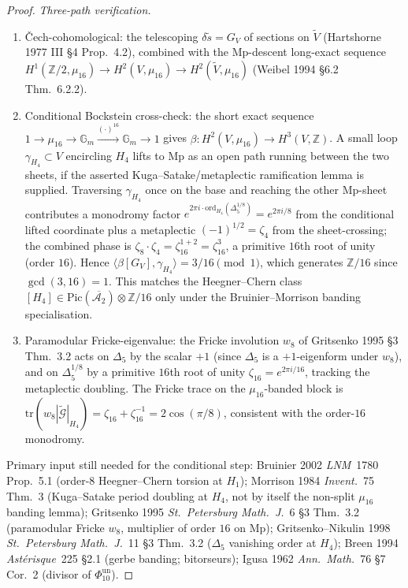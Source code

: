\begin{proof}
\emph{Three-path verification.}
\begin{enumerate}[label=\textup{(V\arabic*)}]
\item \v Cech-cohomological: the telescoping
$\delta\widetilde s = G_V$ of sections on $\widetilde V$ (Hartshorne
1977 III \S4 Prop.~4.2), combined with the $\mathrm{Mp}$-descent
long-exact sequence
$H^1(\mathbb Z/2,\mu_{16})\to H^2(V,\mu_{16})\to H^2(\widetilde V,\mu_{16})$
(Weibel 1994 \S6.2 Thm.~6.2.2).
\item Conditional Bockstein cross-check: the short exact sequence
$1\to\mu_{16}\to\mathbb G_m\xrightarrow{(\cdot)^{16}}\mathbb G_m\to 1$
gives $\beta\colon H^2(V,\mu_{16})\to H^3(V,\mathbb Z)$. A small loop
$\gamma_{H_4}\subset V$ encircling $H_4$ lifts to Mp as an open path
running between the two sheets, if the asserted Kuga--Satake/metaplectic
ramification lemma is supplied.
Traversing $\gamma_{H_4}$ once on the base and reaching the other
Mp-sheet contributes a monodromy factor
$e^{2\pi i \cdot \mathrm{ord}_{H_4}(\Delta_5^{1/8})} = e^{2\pi i/8}$
from the conditional lifted coordinate plus a metaplectic
$(-1)^{1/2} = \zeta_4$ from the sheet-crossing; the combined phase is
$\zeta_8\cdot\zeta_4 = \zeta_{16}^{1+2} = \zeta_{16}^3$, a primitive
$16$th root of unity (order $16$). Hence
$\langle\beta[G_V],\gamma_{H_4}\rangle = 3/16 \pmod 1$, which
generates $\mathbb Z/16$ since $\gcd(3,16) = 1$. This matches the
Heegner--Chern class $[H_4]\in\mathrm{Pic}(\overline{\mathcal A_2})\otimes\mathbb Z/16$
only under the Bruinier--Morrison banding specialisation.
\item Paramodular Fricke-eigenvalue: the Fricke involution $w_8$ of
Gritsenko 1995 \S3 Thm.~3.2 acts on $\Delta_5$ by the scalar
$+1$ (since $\Delta_5$ is a $+1$-eigenform under $w_8$), and on
$\Delta_5^{1/8}$ by a primitive $16$th root of unity
$\zeta_{16} = e^{2\pi i/16}$, tracking the metaplectic doubling. The
Fricke trace on the $\mu_{16}$-banded block is
$\mathrm{tr}(w_8|\widetilde{\mathcal G}|_{H_4}) = \zeta_{16} +
\zeta_{16}^{-1} = 2\cos(\pi/8)$, consistent with the order-$16$
monodromy.
\end{enumerate}

Primary input still needed for the conditional step: Bruinier 2002
\emph{LNM}~1780 Prop.~5.1 (order-$8$
Heegner--Chern torsion at $H_1$);
Morrison 1984 \emph{Invent.}~75 Thm.~3 (Kuga--Satake period doubling
at $H_4$, not by itself the non-split $\mu_{16}$ banding lemma);
Gritsenko 1995 \emph{St.~Petersburg Math.~J.}~6 \S3 Thm.~3.2
(paramodular Fricke $w_8$, multiplier of order $16$ on Mp);
Gritsenko--Nikulin 1998 \emph{St.~Petersburg Math.~J.}~11 \S3 Thm.~3.2
($\Delta_5$ vanishing order at $H_4$);
Breen 1994 \emph{Ast\'erisque}~225 \S2.1 (gerbe banding; bitorseurs);
Igusa 1962 \emph{Ann.~Math.}~76 \S7 Cor.~2 (divisor of $\Phi_{10}^{\mathrm{un}}$).
\end{proof}

